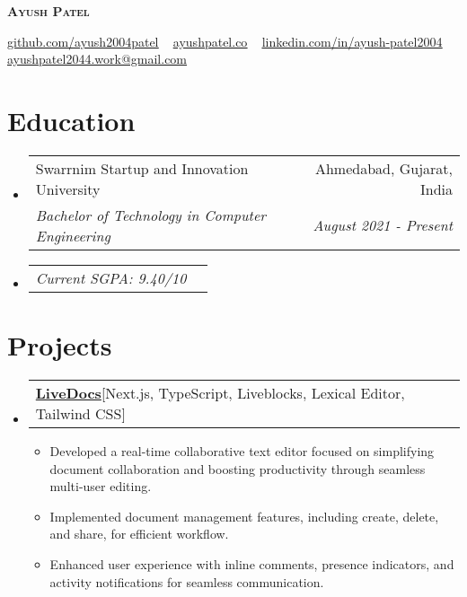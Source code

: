 \documentclass[letterpaper,11pt]{article}
\makeatletter
\newcommand{\resumeItem}[1]{
  \item\small{
    {#1 \vspace{-2pt}}
  }
}
\newcommand{\resumeSubheading}[4]{
  \item
    \begin{tabular*}{0.97\textwidth}[t]{l@{\extracolsep{\fill}}r}
      {#1} & #2 \\
      \textit{\small#3} & \textit{\small #4} \\
    \end{tabular*}\vspace{-5pt}
}
\newcommand{\resumeSubSubheading}[2]{
    \item
    \begin{tabular*}{0.97\textwidth}{l@{\extracolsep{\fill}}r}
      \textit{\small#1} & \textit{\small #2} \\
    \end{tabular*}\vspace{-5pt}
}
\newcommand{\resumeProjectHeading}[2]{
    \item
    \begin{tabular*}{0.97\textwidth}{l@{\extracolsep{\fill}}r}
      \small#1 & #2 \\
    \end{tabular*}\vspace{-5pt}
}
\newcommand{\resumeSubHeadingListStart}{\begin{itemize}[leftmargin=0.15in, label={}]}
\newcommand{\resumeSubHeadingListEnd}{\end{itemize}}
\newcommand{\resumeItemListStart}{\begin{itemize}}
\newcommand{\resumeItemListEnd}{\end{itemize}}
\makeatother
\begin{document}

\begin{center}
\textbf{\Huge \scshape Ayush Patel} \\ \vspace{10pt}

\faGithub \hspace{-0.2pt} \href{https://github.com/ayush2004patel}{\underline{github.com/ayush2004patel}} ~
\faGlobe \hspace{-0.2pt} \href{https://ayushpatel.co/}{\underline{ayushpatel.co}} ~
\faLinkedin \hspace{-0.2pt} \href{https://www.linkedin.com/in/ayush-patel2004/}{\underline{linkedin.com/in/ayush-patel2004}} \\ 
\vspace{10pt} \faEnvelope \hspace{-0.2pt} \href{mailto:ayushpatel2044.work@gmail.com}{\underline{ayushpatel2044.work@gmail.com}}
\end{center}



\section{Education} \vspace{5pt}
\resumeSubHeadingListStart
\resumeSubheading
{Swarrnim Startup and Innovation University}{ Ahmedabad, Gujarat, India}
{Bachelor of Technology in Computer Engineering}{August 2021 - Present} \vspace{-10pt}
\resumeSubSubheading{Current SGPA: 9.40/10}{}
\resumeSubHeadingListEnd



\section{Projects}
\vspace{5pt}
\resumeSubHeadingListStart
\resumeProjectHeading
{\textbf{\href{https://github.com/ayush2004patel/collaborative-editor}{LiveDocs}\hspace{5pt}}{{[Next.js, TypeScript, Liveblocks, Lexical Editor, Tailwind CSS]}}}{}
\resumeItemListStart
\resumeItem{Developed a real-time collaborative text editor focused on simplifying document collaboration and boosting productivity through seamless multi-user editing.}
\resumeItem{Implemented document management features, including create, delete, and share, for efficient workflow.}
\resumeItem{Enhanced user experience with inline comments, presence indicators, and activity notifications for seamless communication.}
\resumeItemListEnd
\resumeSubHeadingListEnd
\end{document}
